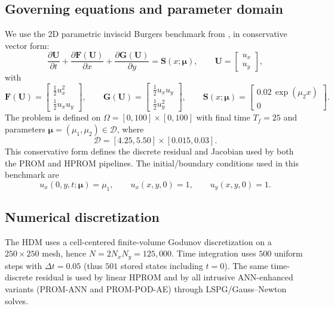 \documentclass[11pt]{article}
\begin{document}
\subsection{Governing equations and parameter domain}
We use the 2D parametric inviscid Burgers benchmark from \cite{barnett2023neural},
in conservative vector form:
\begin{equation}
\frac{\partial \mathbf U}{\partial t}
+\frac{\partial \mathbf F(\mathbf U)}{\partial x}
+\frac{\partial \mathbf G(\mathbf U)}{\partial y}
=\mathbf S(x;\bm\mu),
\qquad
\mathbf U=
\begin{bmatrix}
u_x\\ u_y
\end{bmatrix},
\end{equation}
with
\begin{equation}
\mathbf F(\mathbf U)=
\begin{bmatrix}
\tfrac{1}{2}u_x^2\\
\tfrac{1}{2}u_xu_y
\end{bmatrix},
\qquad
\mathbf G(\mathbf U)=
\begin{bmatrix}
\tfrac{1}{2}u_xu_y\\
\tfrac{1}{2}u_y^2
\end{bmatrix},
\qquad
\mathbf S(x;\bm\mu)=
\begin{bmatrix}
0.02\,\exp(\mu_2 x)\\
0
\end{bmatrix}.
\end{equation}
The problem is defined on $\Omega=[0,100]\times[0,100]$ with final time
$T_f=25$ and parameters $\bm\mu=(\mu_1,\mu_2)\in\mathcal D$, where
\begin{equation}
\mathcal D=[4.25,5.50]\times[0.015,0.03].
\end{equation}
This conservative form defines the discrete residual and Jacobian used by both
the PROM and HPROM pipelines.
The initial/boundary conditions used in this benchmark are
\begin{equation}
u_x(0,y,t;\bm\mu)=\mu_1,\qquad
u_x(x,y,0)=1,\qquad
u_y(x,y,0)=1.
\end{equation}

\subsection{Numerical discretization}
The HDM uses a cell-centered finite-volume Godunov discretization on a
$250\times250$ mesh, hence $N=2N_xN_y=125{,}000$. Time integration uses
$500$ uniform steps with $\Delta t=0.05$ (thus $501$ stored states including
$t=0$). The same time-discrete residual is used by linear HPROM and by all
intrusive ANN-enhanced variants (PROM-ANN and PROM-POD-AE) through
LSPG/Gauss--Newton solves.
\end{document}
